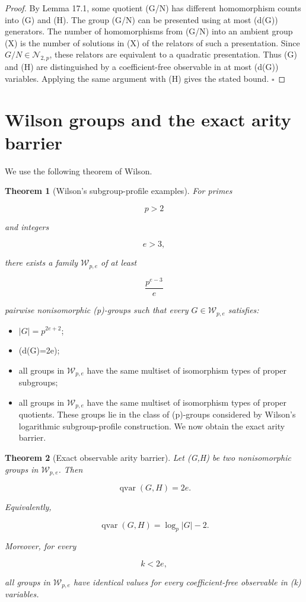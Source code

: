 \documentclass[11pt]{article}
\newtheorem{theorem}{Theorem}[section]
\begin{document}
\begin{proof}
By Lemma 17.1, some quotient (G/N) has different homomorphism counts into (G) and (H). The group (G/N) can be presented using at most (d(G)) generators. The number of homomorphisms from (G/N) into an ambient group (X) is the number of solutions in (X) of the relators of such a presentation. Since $G/N\in\mathcal N_{2,p}$, these relators are equivalent to a quadratic presentation. Thus (G) and (H) are distinguished by a coefficient-free observable in at most (d(G)) variables. Applying the same argument with (H) gives the stated bound. $\square$

\end{proof}

\section{Wilson groups and the exact arity barrier}

We use the following theorem of Wilson.

\begin{theorem}[Wilson's subgroup-profile examples]
For primes

\[
p>2
\]

and integers

\[
e>3,
\]

there exists a family $\mathcal W_{p,e}$ of at least

\[
\frac{p^{e-3}}{e}
\]

pairwise nonisomorphic (p)-groups such that every $G\in\mathcal W_{p,e}$ satisfies:

\end{theorem}

\begin{itemize}
\item $|G|=p^{2e+2}$;
\item (d(G)=2e);
\item all groups in $\mathcal W_{p,e}$ have the same multiset of isomorphism types of proper subgroups;
\item all groups in $\mathcal W_{p,e}$ have the same multiset of isomorphism types of proper quotients.
These groups lie in the class of (p)-groups considered by Wilson's logarithmic subgroup-profile construction. We now obtain the exact arity barrier.

\end{itemize}

\begin{theorem}[Exact observable arity barrier]
Let (G,H) be two nonisomorphic groups in $\mathcal W_{p,e}$. Then

\[
\operatorname{qvar}(G,H)=2e.
\]

Equivalently,

\[
\operatorname{qvar}(G,H)=\log_p|G|-2.
\]

Moreover, for every

\[
k<2e,
\]

all groups in $\mathcal W_{p,e}$ have identical values for every coefficient-free observable in (k) variables.

\end{theorem}
\end{document}
